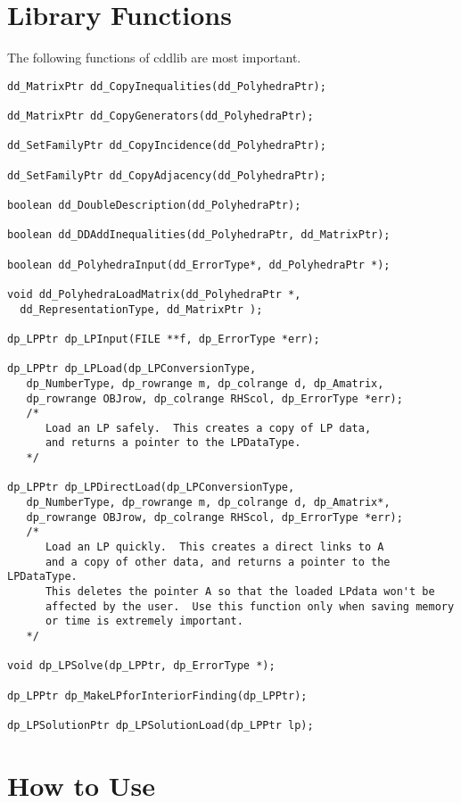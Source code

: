 \documentclass[11pt]{article}
\begin{document}
\section{Library Functions}  \label{LIBRARY}

The following functions of cddlib are most important. 

\begin{verbatim}
dd_MatrixPtr dd_CopyInequalities(dd_PolyhedraPtr);

dd_MatrixPtr dd_CopyGenerators(dd_PolyhedraPtr);

dd_SetFamilyPtr dd_CopyIncidence(dd_PolyhedraPtr);

dd_SetFamilyPtr dd_CopyAdjacency(dd_PolyhedraPtr);

boolean dd_DoubleDescription(dd_PolyhedraPtr);

boolean dd_DDAddInequalities(dd_PolyhedraPtr, dd_MatrixPtr);

boolean dd_PolyhedraInput(dd_ErrorType*, dd_PolyhedraPtr *);

void dd_PolyhedraLoadMatrix(dd_PolyhedraPtr *, 
  dd_RepresentationType, dd_MatrixPtr );

dp_LPPtr dp_LPInput(FILE **f, dp_ErrorType *err);  

dp_LPPtr dp_LPLoad(dp_LPConversionType,
   dp_NumberType, dp_rowrange m, dp_colrange d, dp_Amatrix, 
   dp_rowrange OBJrow, dp_colrange RHScol, dp_ErrorType *err);  
   /* 
      Load an LP safely.  This creates a copy of LP data,
      and returns a pointer to the LPDataType.  
   */

dp_LPPtr dp_LPDirectLoad(dp_LPConversionType,
   dp_NumberType, dp_rowrange m, dp_colrange d, dp_Amatrix*, 
   dp_rowrange OBJrow, dp_colrange RHScol, dp_ErrorType *err);  
   /* 
      Load an LP quickly.  This creates a direct links to A
      and a copy of other data, and returns a pointer to the LPDataType.
      This deletes the pointer A so that the loaded LPdata won't be
      affected by the user.  Use this function only when saving memory
      or time is extremely important.
   */

void dp_LPSolve(dp_LPPtr, dp_ErrorType *);

dp_LPPtr dp_MakeLPforInteriorFinding(dp_LPPtr);  

dp_LPSolutionPtr dp_LPSolutionLoad(dp_LPPtr lp);

\end{verbatim}

\section{How to Use}  \label{HOWTO}
\end{document}
